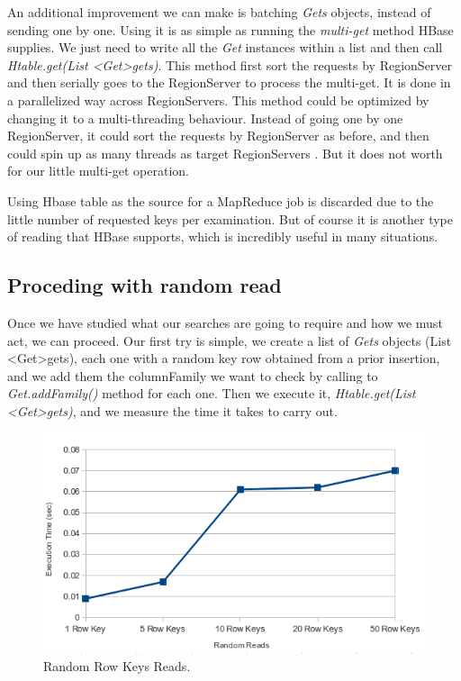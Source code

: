 An additional improvement we can make is batching \textit{Gets} objects, instead of sending one by one. Using it is as simple as running the \textit{multi-get} method HBase supplies. We just need to write all the \textit{Get} instances within a list and then call \textit{Htable.get(List \textless{Get}\textgreater gets)}. This method first sort the requests by RegionServer and then serially goes to the RegionServer to process the multi-get. It is done in a parallelized way across RegionServers. 
This method could be optimized by changing it to a multi-threading behaviour. Instead of going one by one RegionServer, it could sort the requests by RegionServer as before, and then could spin up as many threads as target RegionServers \cite{http://comments.gmane.org/gmane.comp.java.hadoop.hbase.user/34417}. But it does not worth for our little multi-get operation.

\bigskip

Using Hbase table as the source for a MapReduce job is discarded due to the little number of requested keys per examination. But of course it is another type of reading that HBase supports, which is incredibly useful in many situations. 
\par

\subsection{Proceding with random read}

Once we have studied what our searches are going to require and how we must act, we can proceed. Our first try is simple, we create a list of \textit{Gets} objects (List \textless{Get}\textgreater gets), each one with a random key row obtained from a prior insertion, and we add them the columnFamily we want to check by calling to \textit{Get.addFamily()} method for each one. Then we execute it, \textit{Htable.get(List \textless{Get}\textgreater gets)}, and we measure the time it takes to carry out.


\begin{figure}[htb]
\centering
\includegraphics[width=1\textwidth]{./images/randomReads.png}
\caption{Random Row Keys Reads.} \label{fig:randomReads}
\end{figure}




